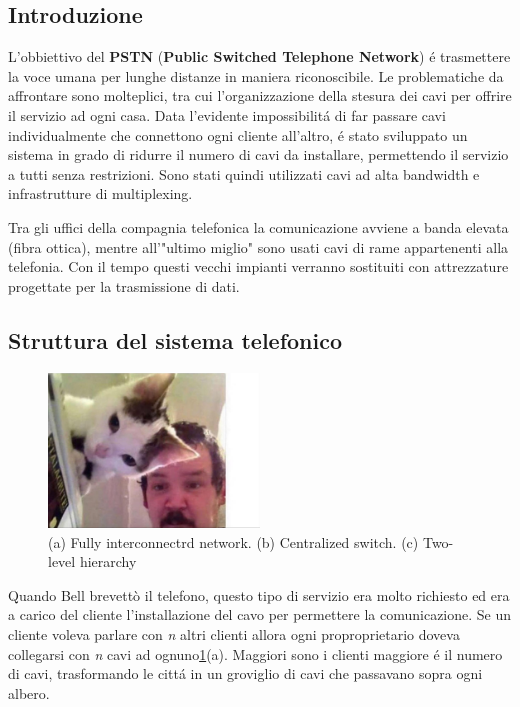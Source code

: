 \documentclass[../ComputerNetworks.tex]{subfiles}
\begin{document}
\subsection{Introduzione}

L’obbiettivo del \textbf{PSTN} (\textbf{Public Switched Telephone Network}) é trasmettere la voce umana per lunghe distanze in maniera riconoscibile.
Le problematiche da affrontare sono molteplici, tra cui l’organizzazione della stesura dei cavi per offrire il servizio ad ogni casa.
Data l’evidente impossibilitá di far passare cavi individualmente che connettono ogni cliente all’altro, é stato sviluppato un sistema in grado di ridurre il numero di cavi da installare, permettendo il servizio a tutti senza restrizioni.
Sono stati quindi utilizzati cavi ad alta bandwidth e infrastrutture di multiplexing.

Tra gli uffici della compagnia telefonica la comunicazione avviene a banda elevata (fibra ottica), mentre all’"ultimo miglio" sono usati cavi di rame appartenenti alla telefonia.
Con il tempo questi vecchi impianti verranno sostituiti con attrezzature progettate per la trasmissione di dati.

\subsection{Struttura del sistema telefonico}

\begin{figure}[h]
    \centering
    \includegraphics[width=0.5\textwidth]{img/29.jpg}
    \caption{(a) Fully interconnectrd network. (b) Centralized switch. (c) Two-level hierarchy}
    \label{fig29}
\end{figure}

Quando Bell brevettò il telefono, questo tipo di servizio era molto richiesto ed era a carico del cliente l’installazione del cavo per permettere la comunicazione.
Se un cliente voleva parlare con \emph{n} altri clienti allora ogni proproprietario doveva collegarsi con \emph{n} cavi ad ognuno\ref{fig29}(a).
Maggiori sono i clienti maggiore é il numero di cavi, trasformando le cittá in un groviglio di cavi che passavano sopra ogni albero.
\end{document}
